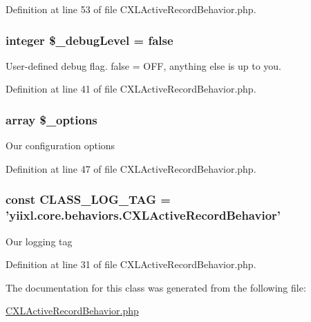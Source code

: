 Definition at line 53 of file CXLActiveRecordBehavior.php.

\hypertarget{classCXLActiveRecordBehavior_aa658930951c1fb5a0640c326c54297c1}{
\subsubsection[{\$\_\-debugLevel}]{\setlength{\rightskip}{0pt plus 5cm}integer \$\_\-debugLevel = false}}
\label{classCXLActiveRecordBehavior_aa658930951c1fb5a0640c326c54297c1}
User-\/defined debug flag. false = OFF, anything else is up to you. 

Definition at line 41 of file CXLActiveRecordBehavior.php.

\hypertarget{classCXLActiveRecordBehavior_ab0cd304a53a2640dc4f15e8d6100612f}{
\subsubsection[{\$\_\-options}]{\setlength{\rightskip}{0pt plus 5cm}array \$\_\-options}}
\label{classCXLActiveRecordBehavior_ab0cd304a53a2640dc4f15e8d6100612f}
Our configuration options 

Definition at line 47 of file CXLActiveRecordBehavior.php.

\hypertarget{classCXLActiveRecordBehavior_aa607ab5e557e6ebb60b85c5a20ad067f}{
\subsubsection[{CLASS\_\-LOG\_\-TAG}]{\setlength{\rightskip}{0pt plus 5cm}const {\bf CLASS\_\-LOG\_\-TAG} = 'yiixl.core.behaviors.CXLActiveRecordBehavior'}}
\label{classCXLActiveRecordBehavior_aa607ab5e557e6ebb60b85c5a20ad067f}
Our logging tag 

Definition at line 31 of file CXLActiveRecordBehavior.php.



The documentation for this class was generated from the following file:\begin{DoxyCompactItemize}
\item 
\hyperlink{CXLActiveRecordBehavior_8php}{CXLActiveRecordBehavior.php}\end{DoxyCompactItemize}
